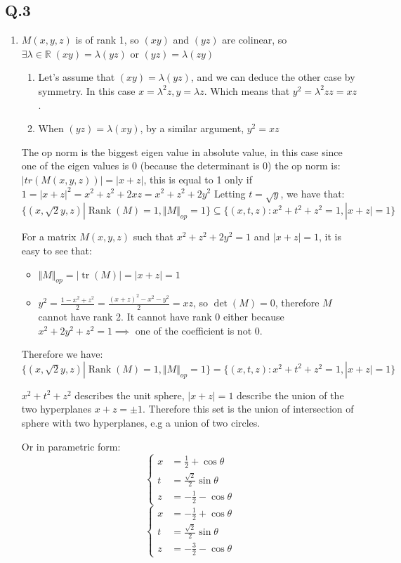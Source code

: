 \documentclass[12pt]{article}
\newcommand{\Q}[1]{\subsection*{Q.#1}}
\newenvironment{question}[1]
{\Q{#1}}{}
\DeclareMathOperator{\tr}{tr}
\DeclareMathOperator{\rank}{Rank}
\begin{document}
\begin{question}{3}
\begin{enumerate}
    \begin{enumerate}
    \item
      $M(x,y,z)$ is of rank 1, so $(x y)$ and $(y z)$ are colinear, so  $ \exists \lambda  \in \mathbb{R} \; (x y) = \lambda (y z)  \text{ or } (y z) = \lambda (z y)$
      \begin{enumerate}
      \item Let's assume that $(x y) = \lambda (y z)$, and we can
        deduce the other case by symmetry.  In this case
        $x = \lambda^2 z, y = \lambda z$. Which means that $y^2 = \lambda^2z z = xz$.
      \item When $(y z) = \lambda (x y)$, by a similar argument, $y^2 = xz$
      \end{enumerate}
      The op norm is the biggest eigen value in absolute value, in this case since one of the
      eigen values is 0 (because the determinant is 0) the op norm is:
      $|tr(M(x, y, z))| = |x + z|$, this is equal to 1 only if $1 = |x+z|^2 = x^2 + z^2 + 2xz = x^2 + z^2 + 2y^2$
      Letting $t = \sqrt y$, we have that:
      $\{ (x, \sqrt2 y, z) | \rank(M) = 1, \Vert M\Vert _{op} = 1 \} \subseteq \{ (x, t, z): x^2 + t^2 + z^2 = 1, |x+z|=1  \} $


      
      For a matrix $M(x, y, z)$ such that $x^2 + z^2 + 2y^2 = 1$ and $|x+z|=1$, it is easy to see that:
      \begin{itemize}
      \item $\Vert M\Vert _{op} = |\tr(M)| = |x+z| = 1$
      \item $y^2 = \frac{1 - x^2 + z^2}2 = \frac{(x+z)^2 - x^2 - y^2}2 = xz$, so $\det(M) = 0$, therefore $M$ cannot have rank 2. It cannot have rank 0 either because $x^2 + 2y^2 + z^2 = 1 \implies$ one of the coefficient is not 0.
      \end{itemize}
      Therefore we have:
      $\{ (x, \sqrt2 y, z) | \rank(M) = 1, \Vert M\Vert _{op} = 1 \} = \{ (x, t, z): x^2 + t^2 + z^2 = 1, |x+z|=1  \} $
      
      $x^2 + t^2 + z^2$ describes the unit sphere, $|x+z| = 1$ describe the union of the two hyperplanes $x + z = \pm 1$.
      Therefore this set is the union of  intersection of sphere with two hyperplanes, e.g a union of two circles.

      Or in parametric form:
      \[
        \left\{
          \begin{array}{cc}
            x &=  \frac12 + \cos \theta \\
            t &= \frac{\sqrt2}2 \sin \theta \\
            z &= - \frac12 - \cos \theta
          \end{array}
        \right.
      \]
      \[
        \left\{
          \begin{array}{cc}
            x &=  -\frac12 + \cos \theta \\
            t &= \frac{\sqrt2}2 \sin \theta \\
            z &=  -\frac32 - \cos \theta
          \end{array}
        \right.
      \]     


\end{enumerate}
\end{enumerate}
\end{question}
\end{document}
